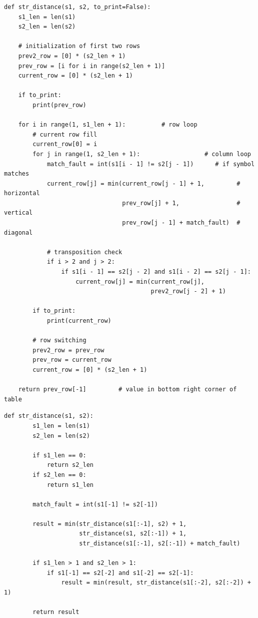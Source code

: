 \documentclass[14pt, a4paper]{report}
\begin{document}
	\begin{lstlisting}[label=some-code,caption=Расстояние Дамерау-Левенштейна (матрично)]
	def str_distance(s1, s2, to_print=False):
    s1_len = len(s1)
    s2_len = len(s2)

    # initialization of first two rows
    prev2_row = [0] * (s2_len + 1)
    prev_row = [i for i in range(s2_len + 1)]
    current_row = [0] * (s2_len + 1)

    if to_print:
        print(prev_row)

    for i in range(1, s1_len + 1):          # row loop
        # current row fill
        current_row[0] = i
        for j in range(1, s2_len + 1):                  # column loop
            match_fault = int(s1[i - 1] != s2[j - 1])      # if symbol matches
            current_row[j] = min(current_row[j - 1] + 1,         # horizontal
                                 prev_row[j] + 1,                # vertical
                                 prev_row[j - 1] + match_fault)  # diagonal

            # transposition check
            if i > 2 and j > 2:
                if s1[i - 1] == s2[j - 2] and s1[i - 2] == s2[j - 1]:
                    current_row[j] = min(current_row[j],
                                         prev2_row[j - 2] + 1)

        if to_print:
            print(current_row)

        # row switching
        prev2_row = prev_row
        prev_row = current_row
        current_row = [0] * (s2_len + 1)

    return prev_row[-1]         # value in bottom right corner of table
	\end{lstlisting}

	\begin{lstlisting}[label=some-code,caption=Расстояние Дамерау-Левенштейна (рекурсивно)]
		def str_distance(s1, s2):
	    s1_len = len(s1)
	    s2_len = len(s2)
	
	    if s1_len == 0:
	        return s2_len
	    if s2_len == 0:
	        return s1_len
	
	    match_fault = int(s1[-1] != s2[-1])
	
	    result = min(str_distance(s1[:-1], s2) + 1,
	                 str_distance(s1, s2[:-1]) + 1,
	                 str_distance(s1[:-1], s2[:-1]) + match_fault)
	
	    if s1_len > 1 and s2_len > 1:
	        if s1[-1] == s2[-2] and s1[-2] == s2[-1]:
	            result = min(result, str_distance(s1[:-2], s2[:-2]) + 1)
	
	    return result
	\end{lstlisting}
	
\end{document}
